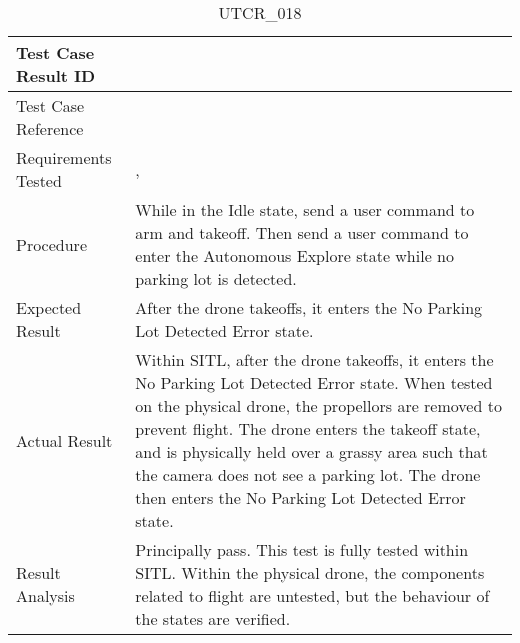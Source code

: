 \documentclass[12pt, titlepage]{article}
\begin{document}
\begin{table}[!h]
\begin{center}
\caption {UTCR\_018}
\label{tab:UTCR_018}
\begin{tabular}{ | m{3.2cm} | m{12.2cm} | } 
\hline
Test Case Result ID & \nameref{tab:UTCR_018} \\ 
\hline
Test Case Reference & \nameref{tab:UTC_018}  \\ 
\hline
Requirements Tested & \nameref{STA_008}, \nameref{TRANS_008} \\ 
\hline
Procedure & While in the Idle state, send a user command to arm and takeoff. Then send a user command to enter the Autonomous Explore state while no parking lot is detected. \\ 
\hline
Expected Result & After the drone takeoffs, it enters the No Parking Lot Detected Error state. \\
\hline
Actual Result & Within SITL, after the drone takeoffs, it enters the No Parking Lot Detected Error state. When tested on the physical drone, the propellors are removed to prevent flight. The drone enters the takeoff state, and is physically held over a grassy area such that the camera does not see a parking lot. The drone then enters the No Parking Lot Detected Error state. \\
\hline
Result Analysis & Principally pass. This test is fully tested within SITL. Within the physical drone, the components related to flight are untested, but the behaviour of the states are verified. \\ 
\hline
\end{tabular}
\end{center}
\end{table}
\end{document}
